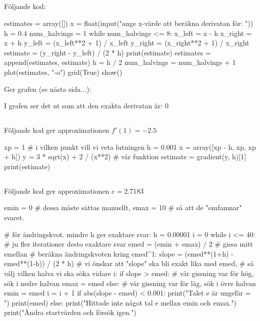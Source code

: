 \subsection*{}
Följande kod:
\vspace{10pt}
\begin{python}
estimates = array([])
x = float(input("ange x-värde att beräkna derivatan för: "))
h = 0.4
num_halvings = 1
while num_halvings <= 8:
    x_left  = x - h
    x_right = x + h
    y_left  = (x_left**2 + 1) / x_left
    y_right = (x_right**2 + 1) / x_right
    estimate = (y_right - y_left) / (2 * h)
    print(estimate)
    estimates = append(estimates, estimate)
    h = h / 2
    num_halvings = num_halvings + 1
plot(estimates, "-o")
grid(True)
show()
\end{python}

Ger grafen (se nästa sida...):
\newpage
{}

I grafen ser det ut som att den exakta derivatan är: 0

\subsection*{}
Följande kod ger approximationen $f'(1) = -2.5$
\vspace{10pt}
\begin{python}
xp = 1 # i vilken punkt vill vi veta lutningen
h = 0.001
x = array([xp - h, xp, xp + h])
y = 3 * sqrt(x) + 2 / (x**2) # vår funktion
estimate = gradient(y, h)[1]
print(estimate)
\end{python}

\subsection*{}
Följande kod ger approximationen $e = 2.7183$
\vspace{10pt}
\begin{python}
emin = 0 # dessa måste sättas manuellt,
emax = 10 # så att de "omfamnar" svaret.

# för ändringskvot. mindre h ger exaktare svar:
h = 0.00001
i = 0
while i <= 40: # ju fler iterationer desto exaktare svar
	emed = (emin + emax) / 2 # gissa mitt emellan
	# beräkna ändringskvoten kring emed^1:
	slope = (emed**(1+h) - emed**(1-h)) / (2 * h)
	# vi önskar att "slope" ska bli exakt lika med emed,
	# så välj vilken halva vi ska söka vidare i:
	if slope > emed:
		# vår gissning var för hög, sök i nedre halvan
		emax = emed
	else:
		# vår gissning var för låg, sök i övre halvan
		emin = emed
	i = i + 1
if abs(slope - emed) < 0.001:
	print("Talet e är ungefär = ")
	print(emed)
else:
	print("Hittade inte något tal e mellan emin och emax.")
	print("Ändra startvärden och försök igen.")
\end{python}
